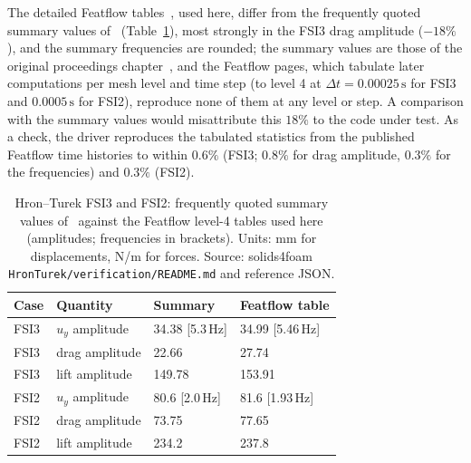 The detailed Featflow tables~\citep{FeatflowFSI,Turek2010}, used here, differ from the frequently quoted summary values of~\citet{Turek2006} (Table~\ref{tab:hronturek_ref}), most strongly in the FSI3 drag amplitude ($-18\%$), and the summary frequencies are rounded; the summary values are those of the original proceedings chapter~\citep{Turek2006}, and the Featflow pages, which tabulate later computations per mesh level and time step (to level 4 at $\Delta t = 0.00025\,\mathrm{s}$ for FSI3 and $0.0005\,\mathrm{s}$ for FSI2), reproduce none of them at any level or step. A comparison with the summary values would misattribute this $18\%$ to the code under test.
As a check, the driver reproduces the tabulated statistics from the published Featflow time histories to within $0.6\%$ (FSI3; $0.8\%$ for drag amplitude, $0.3\%$ for the frequencies) and $0.3\%$ (FSI2).

\begin{table}[htbp]
	\centering
	\small
	\setlength{\tabcolsep}{5pt}
	\caption{Hron--Turek FSI3 and FSI2: frequently quoted summary values of~\citet{Turek2006} against the Featflow level-4 tables used here (amplitudes; frequencies in brackets). Units: mm for displacements, N/m for forces. Source: solids4foam \texttt{HronTurek/verification/README.md} and reference JSON.}
	\label{tab:hronturek_ref}
	\begin{tabular}{llll}
		\toprule
		Case & Quantity & Summary~\citep{Turek2006} & Featflow table \\
		\midrule
		FSI3 & $u_y$ amplitude & 34.38 [5.3\,Hz] & 34.99 [5.46\,Hz] \\
		FSI3 & drag amplitude & 22.66 & 27.74 \\
		FSI3 & lift amplitude & 149.78 & 153.91 \\
		FSI2 & $u_y$ amplitude & 80.6 [2.0\,Hz] & 81.6 [1.93\,Hz] \\
		FSI2 & drag amplitude & 73.75 & 77.65 \\
		FSI2 & lift amplitude & 234.2 & 237.8 \\
		\bottomrule
	\end{tabular}
\end{table}

